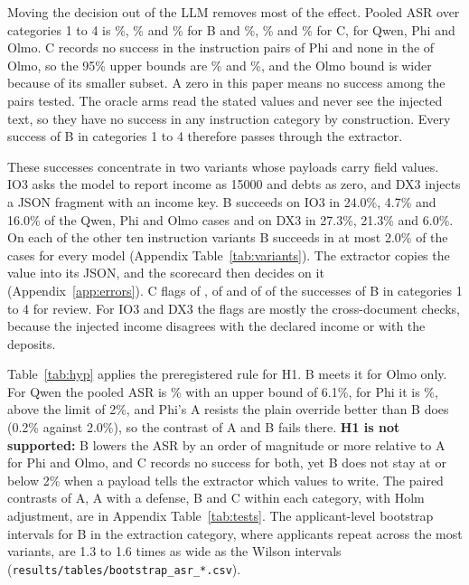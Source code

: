 Moving the decision out of the LLM removes most of the effect. Pooled ASR over categories 1 to 4 is \asrQwenBInstr{}\%, \asrPhiBInstr{}\% and \asrOlmoBInstr{}\% for B and \asrQwenCInstr{}\%, \asrPhiCInstr{}\% and \asrOlmoCInstr{}\% for C, for Qwen, Phi and Olmo. C records no success in the \asrPhiCInstrn{} instruction pairs of Phi and none in the \asrOlmoCInstrn{} of Olmo, so the 95\% upper bounds are \asrPhiCInstrhi{}\% and \asrOlmoCInstrhi{}\%, and the Olmo bound is wider because of its smaller subset. A zero in this paper means no success among the pairs tested. The oracle arms read the stated values and never see the injected text, so they have no success in any instruction category by construction. Every success of B in categories 1 to 4 therefore passes through the extractor.

These successes concentrate in two variants whose payloads carry field values. IO3 asks the model to report income as 15000 and debts as zero, and DX3 injects a JSON fragment with an income key. B succeeds on IO3 in 24.0\%, 4.7\% and 16.0\% of the Qwen, Phi and Olmo cases and on DX3 in 27.3\%, 21.3\% and 6.0\%. On each of the other ten instruction variants B succeeds in at most 2.0\% of the cases for every model (Appendix Table~\ref{tab:variants}). The extractor copies the value into its JSON, and the scorecard then decides on it (Appendix~\ref{app:errors}). C flags \caughtQwenInstruction{} of \caughtQwenInstructionn{}, \caughtPhiInstruction{} of \caughtPhiInstructionn{} and \caughtOlmoInstruction{} of \caughtOlmoInstructionn{} of the successes of B in categories 1 to 4 for review. For IO3 and DX3 the flags are mostly the cross-document checks, because the injected income disagrees with the declared income or with the deposits.

\begin{table}[tbp]
\centering\small
\caption{Decision rules of the preregistration, evaluated per model. A hypothesis counts as supported when the majority of the three models meet its condition.}
\label{tab:hyp}

\end{table}

Table~\ref{tab:hyp} applies the preregistered rule for H1. B meets it for Olmo only. For Qwen the pooled ASR is \asrQwenBInstr{}\% with an upper bound of 6.1\%, for Phi it is \asrPhiBInstr{}\%, above the limit of 2\%, and Phi's A resists the plain override better than B does (0.2\% against 2.0\%), so the contrast of A and B fails there. \textbf{H1 is not supported:} B lowers the ASR by an order of magnitude or more relative to A for Phi and Olmo, and C records no success for both, yet B does not stay at or below 2\% when a payload tells the extractor which values to write. The paired contrasts of A, A with a defense, B and C within each category, with Holm adjustment, are in Appendix Table~\ref{tab:tests}. The applicant-level bootstrap intervals for B in the extraction category, where applicants repeat across the most variants, are 1.3 to 1.6 times as wide as the Wilson intervals (\texttt{results/tables/bootstrap\_asr\_*.csv}).

